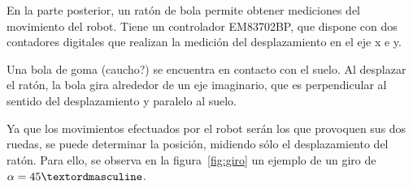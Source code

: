\documentclass[10pt,a4paper,hidelinks]{article}
\begin{document}
\begin{multicols}{2}
En la parte posterior, un ratón de bola permite obtener mediciones del movimiento del
robot. Tiene un controlador EM83702BP, que dispone con dos contadores digitales que
realizan la medición del desplazamiento en el eje x e y.

Una bola de goma (caucho?) se encuentra en contacto con el suelo. Al desplazar el ratón, 
la bola gira alrededor de un eje imaginario, que es perpendicular al sentido del
desplazamiento y paralelo al suelo.


Ya que los movimientos efectuados por el robot serán los que provoquen sus dos ruedas,
se puede determinar la posición, midiendo sólo el desplazamiento del ratón. Para ello,
se observa en la figura~\ref{fig:giro} un ejemplo de un giro de $\alpha = \RobotAngleº$.

\begin{center}
\end{center}
\end{multicols}
\end{document}
